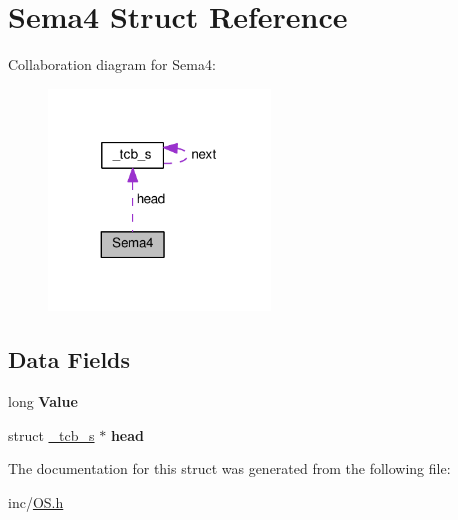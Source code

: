 \hypertarget{structSema4}{}\section{Sema4 Struct Reference}
\label{structSema4}


Collaboration diagram for Sema4\+:
\nopagebreak
\begin{figure}[H]
\begin{center}
\leavevmode
\includegraphics[width=167pt]{structSema4__coll__graph}
\end{center}
\end{figure}
\subsection*{Data Fields}
\begin{DoxyCompactItemize}
\item 
long {\bfseries Value}\hypertarget{structSema4_a98b1e5b4f3a76692bb37db553c22e8b0}{}\label{structSema4_a98b1e5b4f3a76692bb37db553c22e8b0}

\item 
struct \hyperlink{struct__tcb__s}{\+\_\+tcb\+\_\+s} $\ast$ {\bfseries head}\hypertarget{structSema4_a03d774cbfedb9d522f31ded4c10d5668}{}\label{structSema4_a03d774cbfedb9d522f31ded4c10d5668}

\end{DoxyCompactItemize}


The documentation for this struct was generated from the following file\+:\begin{DoxyCompactItemize}
\item 
inc/\hyperlink{OS_8h}{O\+S.\+h}\end{DoxyCompactItemize}
